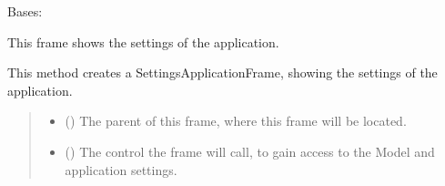 \documentclass[letterpaper,10pt,english]{sphinxmanual}
\begin{document}
\begin{fulllineitems}
\label{\detokenize{apidoc/src.osm_configurator.view.utilityframes:src.osm_configurator.view.utilityframes.settings_application_frame.SettingsApplicationFrame}}
\pysigstartsignatures
{}
\pysigstopsignatures
\sphinxAtStartPar
Bases: 

\sphinxAtStartPar
This frame shows the settings of the application.

\begin{fulllineitems}
\label{\detokenize{apidoc/src.osm_configurator.view.utilityframes:src.osm_configurator.view.utilityframes.settings_application_frame.SettingsApplicationFrame.__init__}}
\pysigstartsignatures
{}
\pysigstopsignatures
\sphinxAtStartPar
This method creates a SettingsApplicationFrame, showing the settings of the application.
\begin{quote}\begin{description}
\begin{itemize}
\item {} 
\sphinxAtStartPar
{} ({\hyperref[\detokenize{apidoc/src.osm_configurator.view.toplevelframes:src.osm_configurator.view.toplevelframes.settings_frame.SettingsFrame}]{}}) \textendash{} The parent of this frame, where this frame will be located.

\item {} 
\sphinxAtStartPar
{} ({\hyperref[\detokenize{apidoc/src.osm_configurator.control:src.osm_configurator.control.control_interface.IControl}]{}}) \textendash{} The control the frame will call, to gain access to the Model and application settings.

\end{itemize}


\end{description}
\end{quote}
\end{fulllineitems}
\end{fulllineitems}
\end{document}

